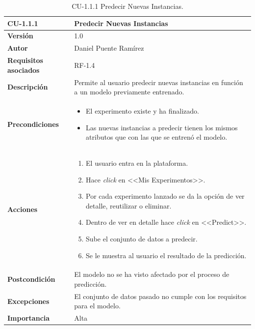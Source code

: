 \begin{table}[p]
\centering
\begin{tabularx}{\linewidth}{ p{} p{} }
\toprule
\textbf{CU-1.1.1} & \textbf{Predecir Nuevas Instancias}\\
\toprule
\textbf{Versión} & 1.0\\
\textbf{Autor} & Daniel Puente Ramírez\\
\textbf{Requisitos asociados} & RF-1.4\\
\textbf{Descripción} & Permite al usuario predecir nuevas instancias en función a un modelo previamente entrenado.\\
\textbf{Precondiciones} & 
\begin{itemize}
\tightlist
\item El experimento existe y ha finalizado.
\item Las nuevas instancias a predecir tienen los mismos atributos que con las que se entrenó el modelo.
\end{itemize}\\
\textbf{Acciones} &
\begin{enumerate}
\def\labelenumi{\arabic{enumi}.}
\tightlist
\item El usuario entra en la plataforma.
\item Hace \textit{click} en <<Mis Experimentos>>.
\item Por cada experimento lanzado se da la opción de ver detalle, reutilizar o eliminar.
\item Dentro de ver en detalle hace \textit{click} en <<Predict>>.
\item Sube el conjunto de datos a predecir.
\item Se le muestra al usuario el resultado de la predicción.
\end{enumerate}\\
\textbf{Postcondición} & El modelo no se ha visto afectado por el proceso de predicción.\\
\textbf{Excepciones} & El conjunto de datos pasado no cumple con los requisitos para el modelo.\\
\textbf{Importancia} & Alta \\
\bottomrule
\end{tabularx}
\caption{CU-1.1.1 Predecir Nuevas Instancias.}
\end{table}


